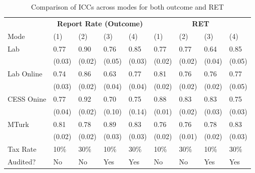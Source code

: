 \begin{table}[ht]
\centering
\begin{tabular}{lllll|llll}
  \hline & \multicolumn{4}{c}{\textbf{Report Rate (Outcome)}} & \multicolumn{4}{c}{\textbf{RET}} \\ \cline{2-9}Mode & (1) & (2) & (3) & (4) & (1) & (2) & (3) & (4) \\ 
  \hline
Lab & 0.77 & 0.90 & 0.76 & 0.85 & 0.77 & 0.77 & 0.64 & 0.85 \\ 
   & (0.03) & (0.02) & (0.05) & (0.03) & (0.02) & (0.02) & (0.04) & (0.05) \\ 
  Lab Online & 0.74 & 0.86 & 0.63 & 0.77 & 0.81 & 0.76 & 0.76 & 0.77 \\ 
   & (0.03) & (0.02) & (0.04) & (0.04) & (0.02) & (0.02) & (0.02) & (0.05) \\ 
  CESS Onine & 0.77 & 0.92 & 0.70 & 0.75 & 0.88 & 0.83 & 0.83 & 0.75 \\ 
   & (0.04) & (0.02) & (0.10) & (0.14) & (0.01) & (0.02) & (0.03) & (0.03) \\ 
  MTurk & 0.81 & 0.78 & 0.89 & 0.83 & 0.76 & 0.76 & 0.78 & 0.83 \\ 
   & (0.02) & (0.02) & (0.03) & (0.03) & (0.02) & (0.01) & (0.02) & (0.03) \\ 
   \hline
Tax Rate & 10\% & 30\% & 10\% & 30\% & 10\% & 30\% & 10\% & 30\% \\ 
  Audited? & No & No & Yes & Yes & No & No & Yes & Yes \\ 
   \hline
\end{tabular}
\caption{Comparison of ICCs across modes for both outcome and RET} 
\label{tab:icc}
\end{table}
